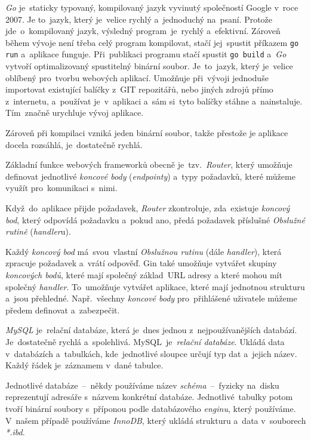 \documentclass[10pt,a4paper]{article}
\begin{document}
            \emph{Go} je~staticky typovaný, kompilovaný jazyk vyvinutý společností Google v~roce 2007. Je to~jazyk, který je~velice rychlý a~jednoduchý na~psaní. Protože jde~o~kompilovaný jazyk, výsledný program~je~rychlý a~efektivní. Zároveň během vývoje není třeba celý program kompilovat, stačí jej~spustit příkazem \texttt{go run} a~aplikace funguje. Při~publikaci programu stačí spustit \texttt{go build} a~\emph{Go} vytvoří optimalizovaný spustitelný binární soubor. Je~to~jazyk, který je~velice oblíbený pro~tvorbu webových aplikací. Umožňuje při~vývoji jednoduše importovat existující balíčky z~GIT repozitářů, nebo jiných zdrojů přímo z~internetu, a~používat je~v~aplikaci a~sám si~tyto balíčky stáhne a~nainstaluje. Tím~značně urychluje vývoj aplikace.

            Zároveň při kompilaci vzniká jeden binární soubor, takže přestože je aplikace docela rozsáhlá, je~dostatečně rychlá.

            Základní funkce webových frameworků obecně je~tzv.~\emph{Router}, který umožňuje definovat jednotlivé \emph{koncové body} (\emph{endpointy}) a~typy požadavků, které můžeme využít pro~komunikaci s~nimi.
            
            Když~do~aplikace přijde požadavek, \emph{Router} zkontroluje, zda~existuje \emph{koncový bod}, který odpovídá požadavku a~pokud ano, předá požadavek příslušné \emph{Obslužné rutině} (\emph{handler}u).

            Každý \emph{koncový bod} má~svou~vlastní \emph{Obslužnou rutinu} (dále \emph{handler}), která zpracuje požadavek a~vrátí odpověď.
            Gin také umožňuje vytvářet skupiny \emph{koncových bodů}, které mají společný základ~URL adresy a které mohou mít společný \emph{handler}.
            To~umožňuje vytvářet aplikace, které mají jednotnou strukturu a~jsou přehledné. Např.~všechny \emph{koncové body} pro~přihlášené
            uživatele můžeme předem definovat a~zabezpečit.
            
            \emph{MySQL} je~relační databáze, která je~dnes jednou z~nejpoužívanějších databází. Je~dostatečně rychlá a~spolehlivá. \cite{databases21}
            MySQL~je~\emph{relační databáze}. Ukládá data v~databázích a~tabulkách, kde~jednotlivé sloupce určují typ dat a~jejich název. Každý řádek je~záznamem v~dané tabulce.
            
            Jednotlivé databáze~--~někdy používáme název \emph{schéma}~--~fyzicky na~disku reprezentují adresáře s~názvem konkrétní databáze. Jednotlivé~tabulky potom tvoří binární soubory s~příponou podle databázového \emph{enginu}, který používáme. V~našem případě používáme \emph{InnoDB}, který ukládá strukturu a~data v~souborech \emph{*.ibd}. \cite{MySQLInnoDB}
            
\end{document}
